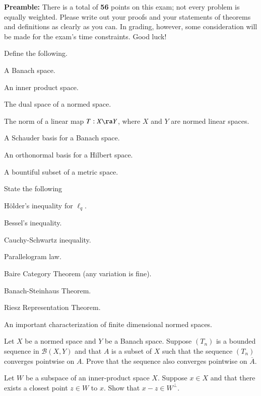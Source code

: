 \documentclass[minion]{homework}
\def\pts  #1{{\bf[#1 points]}\par}
\begin{document}
{\bf Preamble:} \quad  There is a total of {\bf 56} points on this exam; not every problem is equally weighted.
 Please write out your proofs and your statements of theorems and definitions as clearly as you can.
 In grading, however, some consideration will be made for the exam's time constraints. Good luck!

\begin{aproblems}
\hproblem\pts{14} Define the following.
\begin{subproblems}
  \item A Banach space.
  \item An inner product space.
  \item The dual space of a normed space.
  \item The norm of a linear map $T:X\ra Y$, where $X$ and $Y$
  are normed linear spaces.
  \item A Schauder basis for a Banach space.
  \item An orthonormal basis for a Hilbert space.
  \item A bountiful subset of a metric space.
\end{subproblems}

\hproblem\pts{16} State the following
\begin{subproblems}
	\item H\"older's inequality for $\ell_q$.
	\item Bessel's inequality.
	\item Cauchy-Schwartz inequality.
	\item Parallelogram law.
	\item Baire Category Theorem (any variation is fine).
	\item Banach-Steinhaus Theorem.
	\item Riesz Representation Theorem.
	\item An important characterization of finite dimensional normed spaces.
\end{subproblems}

\hproblem\pts{16} Let $X$ be a normed space and $Y$ be a Banach space.
Suppose $(T_n)$ is a bounded sequence in $\mathcal{B}(X,Y)$
and that $A$ is a subset of $X$ such that the sequence 
$(T_n)$ converges pointwise on $A$.  Prove that the
sequence also converges pointwise on $\overline{A}$.

\hproblem\pts{10} Let $W$ be a subspace of an inner-product space $X$.
Suppose $x\in X$ and that there exists a closest point $z\in W$
to $x$.  Show that $x-z \in W^\perp$.

\end{aproblems}
\end{document}
